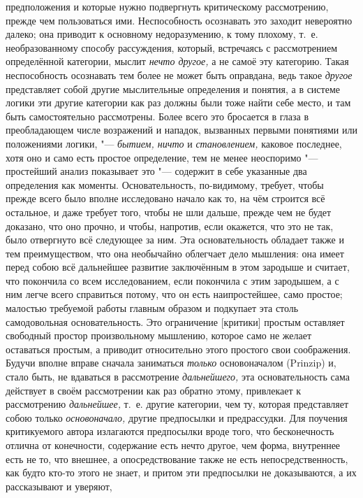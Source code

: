 предположения и которые нужно подвергнуть критическому рассмотрению, прежде чем
пользоваться ими. Неспособность осознавать это заходит невероятно далеко; она
приводит к основному недоразумению, к тому плохому, т.~е. необразованному
способу рассуждения, который, встречаясь с рассмотрением определённой
категории, мыслит {\em нечто другое,} а не самоё эту категорию. Такая неспособность
осознавать тем более не может быть оправдана, ведь такое {\em другое} представляет собой другие
мыслительные определения и понятия, а в системе логики эти другие категории
как раз должны были тоже найти себе место, и там быть
самостоятельно рассмотрены. Более всего это бросается в глаза в
преобладающем числе возражений и нападок, вызванных первыми понятиями или
положениями логики, "--- {\em бытием, ничто} и {\em становлением,} каковое
последнее, хотя оно и само есть простое определение, тем не менее неоспоримо
"--- простейший анализ показывает это "--- содержит в себе указанные два
определения как моменты. Основательность, по-видимому, требует, чтобы прежде
всего было вполне исследовано начало как то, на чём строится всё остальное, и
даже требует того, чтобы не шли дальше, прежде чем не будет доказано, что оно
прочно, и чтобы, напротив, если окажется, что это не так, было отвергнуто всё
следующее за ним. Эта основательность обладает также и тем преимуществом, что
она необычайно облегчает дело мышления: она имеет перед собою всё дальнейшее
развитие заключённым в этом зародыше и считает, что покончила со всем
исследованием, если покончила с этим зародышем, а с ним легче всего справиться
потому, что он есть наипростейшее, само простое; малостью требуемой работы
главным образом и подкупает эта столь самодовольная основательность. Это
ограничение [критики] простым оставляет свободный простор произвольному
мышлению, которое само не желает оставаться простым, а приводит относительно
этого простого свои соображения. Будучи вполне вправе сначала заниматься
{\em только} основоначалом (Prinzip) и, стало быть, не вдаваться в рассмотрение
{\em дальнейшего,} эта основательность сама действует в своём рассмотрении как
раз обратно этому, привлекает к рассмотрению {\em дальнейшее,} т.~е. другие
категории, чем ту, которая представляет собою только {\em основоначало,} другие
предпосылки и предрассудки. Для поучения критикуемого автора излагаются
предпосылки вроде того, что бесконечность отлична от конечности, содержание
есть нечто другое, чем форма, внутреннее есть не то, что внешнее, а
опосредствование также не есть непосредственность, как будто кто-то этого не
знает, и притом эти предпосылки не доказываются, а их рассказывают и уверяют,
